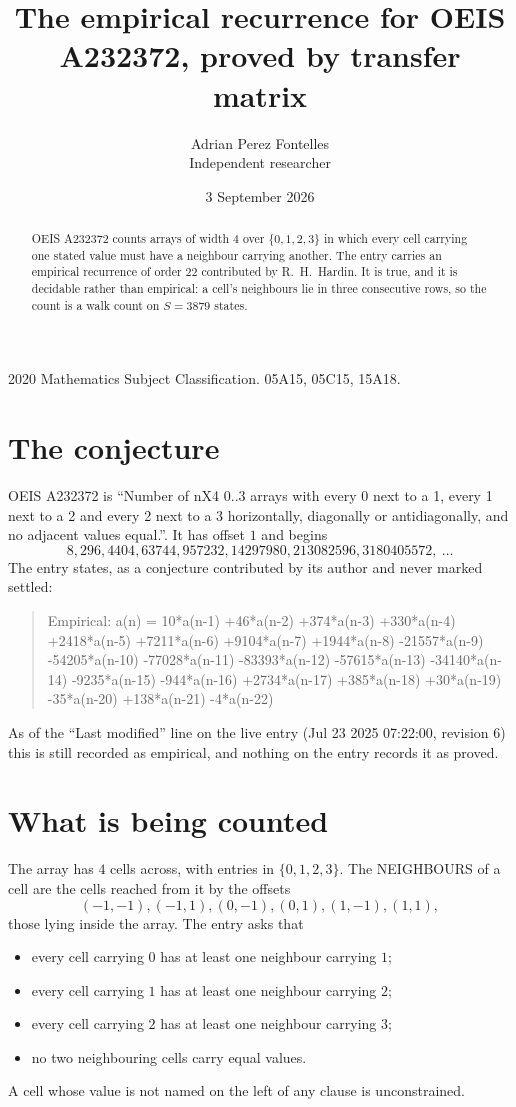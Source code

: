 \documentclass[11pt,a4paper]{article}
\title{The empirical recurrence for OEIS A232372, proved by transfer matrix}
\author{Adrian Perez Fontelles\\ \small Independent researcher}
\date{3 September 2026}
\theoremstyle{plain}
\theoremstyle{definition}
\begin{document}
\maketitle

\begin{abstract}
OEIS A232372 counts arrays of width $4$ over $\{0,1,2,3\}$ in which every cell carrying one stated
value must have a neighbour carrying another. The entry carries an empirical recurrence of
order $22$ contributed by R.~H.~Hardin. It is true, and it is decidable rather than
empirical: a cell's neighbours lie in three consecutive rows, so the count is a walk count on
$S=3879$ states.
\end{abstract}

\noindent\small 2020 Mathematics Subject Classification. 05A15, 05C15, 15A18.\normalsize

\section{The conjecture}

OEIS A232372 is ``Number of nX4 0..3 arrays with every 0 next to a 1, every 1 next to a 2 and every 2 next to a 3 horizontally, diagonally or antidiagonally, and no adjacent values equal.''. It has offset $1$ and begins
\[
8, 296, 4404, 63744, 957232, 14297980, 213082596, 3180405572,\ \dots
\]
The entry states, as a conjecture contributed by its author and never marked settled:
\begin{quote}
Empirical: a(n) = 10*a(n-1) +46*a(n-2) +374*a(n-3) +330*a(n-4) +2418*a(n-5) +7211*a(n-6) +9104*a(n-7) +1944*a(n-8) -21557*a(n-9) -54205*a(n-10) -77028*a(n-11) -83393*a(n-12) -57615*a(n-13) -34140*a(n-14) -9235*a(n-15) -944*a(n-16) +2734*a(n-17) +385*a(n-18) +30*a(n-19) -35*a(n-20) +138*a(n-21) -4*a(n-22)
\end{quote}
As of the ``Last modified'' line on the live entry (Jul 23 2025 07:22:00, revision 6) this is still
recorded as empirical, and nothing on the entry records it as proved.

\section{What is being counted}

The array has $4$ cells across, with entries in $\{0,1,2,3\}$. The NEIGHBOURS of a cell are the
cells reached from it by the offsets
\[
(-1,-1), (-1,1), (0,-1), (0,1), (1,-1), (1,1),
\]
those lying inside the array. The entry asks that
\begin{itemize}
\item every cell carrying $0$ has at least one neighbour carrying $1$;
\item every cell carrying $1$ has at least one neighbour carrying $2$;
\item every cell carrying $2$ has at least one neighbour carrying $3$;
\item no two neighbouring cells carry equal values.
\end{itemize}
A cell whose value is not named on the left of any clause is unconstrained.
\end{document}

